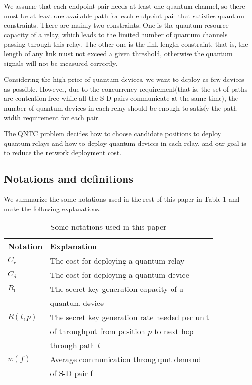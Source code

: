 We assume that each endpoint pair needs at least one quantum channel, so there must be at least one available path for each endpoint pair that satisfies quantum constraints. There are mainly two constraints. One is the quantum resource capacity of a relay, which leads to the limited number of quantum channels passing through this relay. The other one is the link length constraint, that is, the length of any link must not exceed a given threshold, otherwise the quantum signals will not be measured correctly.

Considering the high price of quantum devices, we want to deploy as few devices as possible. However, due to the concurrency requirement(that is, the set of paths are contention-free while all the S-D pairs communicate at the same time), the number of quantum devices in each relay should be enough to satisfy the path width requirement for each pair.

The QNTC problem decides how to choose candidate positions to deploy quantum relays and how to deploy quantum devices in each relay. and our goal is to reduce the network deployment cost.

\subsection{Notations and definitions}
We summarize the some notations used in the rest of this paper in Table 1 and make the following explanations.
\begin{table}[]
	\begin{tabular}{@{}ll@{}}
		\toprule
		Notation & Explanation                      \\ 
		\midrule
		$C_r$   & The cost for deploying a quantum relay                                 \\
		$C_d$    & The cost for deploying a quantum device                              \\
		$R_0$     & The secret key generation capacity of a \\
				& quantum device   \\ 
				
		$R(t,p)$ & The secret key generation rate needed per unit  \\
				&  of throughput from position $p$ to next hop  \\
				&  through path $t$\\
		$w(f)$ &Average communication throughput demand \\
				& of S-D pair f \\
		
		\bottomrule
	\end{tabular}
\caption{Some notations used in this paper}
\end{table}










